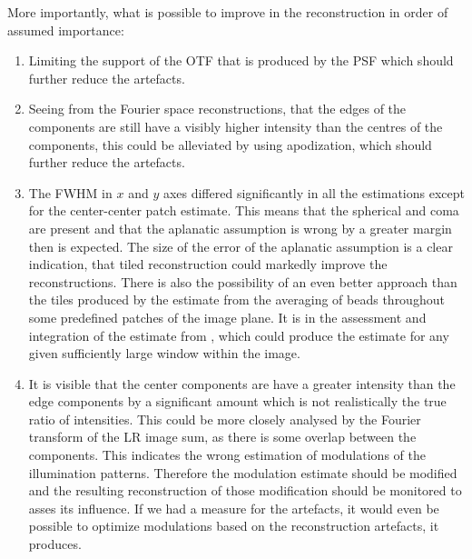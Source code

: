 More importantly, what is possible to improve in the reconstruction in order of assumed importance:
\begin{enumerate}
    \item%
        Limiting the support of the \ac{OTF} that is produced by the \ac{PSF} which should further reduce the
            artefacts.
    \item%
        Seeing from the Fourier space reconstructions, that the edges of the components are still have a visibly
            higher intensity than the centres of the components, this could be alleviated by using apodization, which 
            should further reduce the artefacts.
    \item%
        The \ac{FWHM} in \(x\) and \(y\) axes differed significantly in all the estimations except for the center-center 
            patch estimate.
        This means that the spherical and coma are present and that the aplanatic assumption is wrong by a greater
            margin then is expected.
        The size of the error of the aplanatic assumption is a clear indication, that tiled reconstruction could
            markedly improve the reconstructions.
        There is also the possibility of an even better approach than the tiles produced by the estimate from the
            averaging of beads throughout some predefined patches of the image plane.
        It is in the assessment and integration of the estimate from , which
            could produce the estimate for any given sufficiently large window within the image.
    \item%
        It is visible that the center components are have a greater intensity than the edge components by
        a significant amount which is not realistically the true ratio of intensities. 
        This could be more closely analysed by the Fourier transform of the \ac{LR} image sum, as there is some overlap
            between the components.
        This indicates the wrong estimation of modulations of the illumination patterns.
        Therefore the modulation estimate should be modified and the resulting reconstruction of those modification
            should be monitored to asses its influence.
        If we had a measure for the artefacts, it would even be possible to optimize modulations based on the 
            reconstruction artefacts, it produces.
\end{enumerate}

